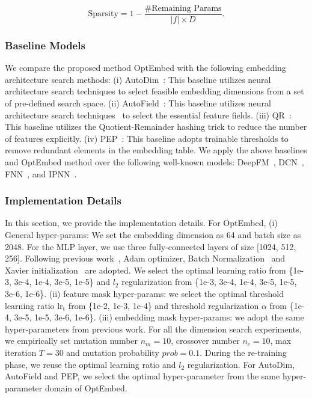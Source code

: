 \documentclass[sigconf]{acmart}
\begin{document}
\begin{equation}
\label{eq:sparsity}
    \text{Sparsity} = 1 - \frac{\text{\#Remaining Params}}{ |f| \times D }.
\end{equation}

\subsubsection{Baseline Models}

We compare the proposed method OptEmbed with the following embedding architecture search methods: 
(i) AutoDim~\cite{AutoDim}: This baseline utilizes neural architecture search techniques\cite{DARTS} to select feasible embedding dimensions from a set of pre-defined search space. 
(ii) AutoField~\cite{autofield}: This baseline utilizes neural architecture search techniques~\cite{DARTS} to select the essential feature fields. 
(iii) QR~\cite{QR}: This baseline utilizes the Quotient-Remainder hashing trick to reduce the number of features explicitly.
(iv) PEP~\cite{PEP}: This baseline adopts trainable thresholds to remove redundant elements in the embedding table. 
We apply the above baselines and OptEmbed method over the following well-known models: DeepFM~\cite{DeepFM}, DCN~\cite{DCN}, FNN~\cite{FNN}, and IPNN~\cite{IPNN}.




\subsubsection{Implementation Details}
In this section, we provide the implementation details. For OptEmbed, (i) General hyper-params: We set the embedding dimension as 64 and batch size as 2048. For the MLP layer, we use three fully-connected layers of size [1024, 512, 256]. Following previous work~\cite{IPNN}, Adam optimizer, Batch Normalization~\cite{BatchNorm} and Xavier initialization~\cite{Xavier} are adopted. We select the optimal learning ratio from \{1e-3, 3e-4, 1e-4, 3e-5, 1e-5\} and $l_2$ regularization from \{1e-3, 3e-4, 1e-4, 3e-5, 1e-5, 3e-6, 1e-6\}. (ii) feature mask hyper-params: we select the optimal threshold learning ratio $\text{lr}_\text{t}$ from \{1e-2, 1e-3, 1e-4\} and threshold regularization $\alpha$ from \{1e-4, 3e-5, 1e-5, 3e-6, 1e-6\}.  (iii) embedding mask hyper-params: we adopt the same hyper-parameters from previous work\cite{One-shot}. For all the dimension search experiments, we empirically set mutation number $n_m = 10$, crossover number $n_c = 10$, max iteration $T=30$ and mutation probability $prob = 0.1$. During the re-training phase, we reuse the optimal learning ratio and $l_2$ regularization. For AutoDim, AutoField and PEP, we select the optimal hyper-parameter from the same hyper-parameter domain of OptEmbed.
\end{document}

